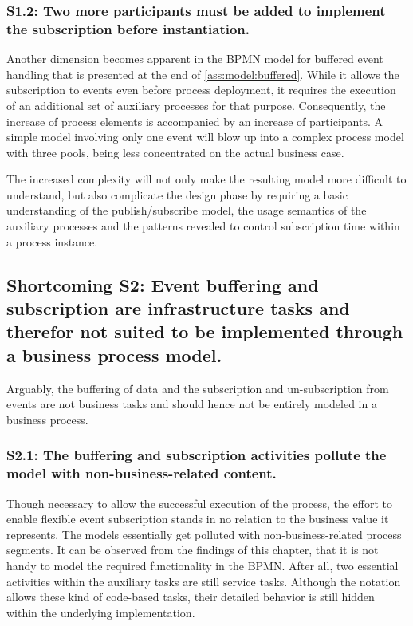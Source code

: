\subsubsection*{S1.2: Two more participants must be added to implement the subscription before instantiation.}

Another dimension becomes apparent in the BPMN model for buffered event handling that is presented at the end of \autoref{ass:model:buffered}. While it allows the subscription to events even before process deployment, it requires the execution of an additional set of auxiliary processes for that purpose.
Consequently, the increase of process elements is accompanied by an increase of participants. A simple model involving only one event will blow up into a complex process model with three pools, being less concentrated on the actual business case.

The increased complexity will not only make the resulting model more difficult to understand, but also complicate the design phase by requiring a basic understanding of the publish/subscribe model, the usage semantics of the auxiliary processes and the patterns revealed to control subscription time within a process instance.


\subsection*{Shortcoming S2: Event buffering and subscription are infrastructure tasks and therefor not suited to be implemented through a business process model.}
Arguably, the buffering of data and the subscription and un-subscription from events are not business tasks and should hence not be entirely modeled in a business process.

\subsubsection*{S2.1: The buffering and subscription activities pollute the model with non-business-related content.}
Though necessary to allow the successful execution of the process, the effort to enable flexible event subscription stands in no relation to the business value it represents. The models essentially get polluted with non-business-related process segments.
It can be observed from the findings of this chapter, that it is not handy to model the required functionality in the BPMN. After all, two essential activities within the auxiliary tasks are still service tasks. Although the notation allows these kind of code-based tasks, their detailed behavior is still hidden within the underlying implementation.

